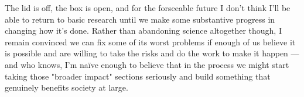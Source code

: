 The lid is off, the box is open, and for the forseeable future I don't think I'll be able to return to basic research until we make some substantive progress in changing how it's done. Rather than abandoning science altogether though, I remain convinced we can fix some of its worst problems if enough of us believe it is possible and are willing to take the risks and do the work to make it happen --- and who knows, I'm naïve enough to believe that in the process we might start taking those "broader impact" sections seriously and build something that genuinely benefits society at large.
